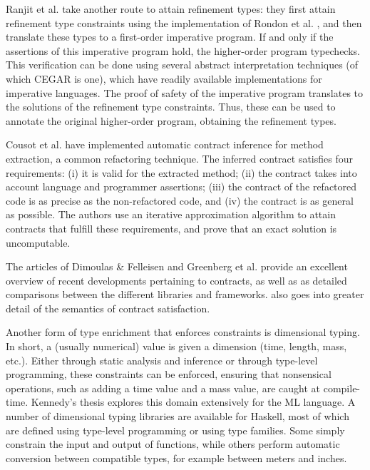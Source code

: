 \documentclass[10pt]{report}
\begin{document}
Ranjit et al. \cite{jhala2010refinement} take another route to attain refinement types: they first attain refinement type constraints using the implementation of Rondon et al. \cite{rondon2008liquid}, and then translate these types to a first-order imperative program.
If and only if the assertions of this imperative program hold, the higher-order program typechecks.
This verification can be done using several abstract interpretation techniques (of which CEGAR is one), which have readily available implementations for imperative languages.
The proof of safety of the imperative program translates to the solutions of the refinement type constraints.
Thus, these can be used to annotate the original higher-order program, obtaining the refinement types.

Cousot et al. \cite{cousotabstract} have implemented automatic contract inference for method extraction, a common refactoring technique.
The inferred contract satisfies four requirements: (i) it is valid for the extracted method; (ii) the contract takes into account language and programmer assertions; (iii) the contract of the refactored code is as precise as the non-refactored code, and (iv) the contract is as general as possible.
The authors use an iterative approximation algorithm to attain contracts that fulfill these requirements, and prove that an exact solution is uncomputable.

The articles of Dimoulas \& Felleisen \cite{Dimoulas:2011:CSH:2039346.2039348} and Greenberg et al. \cite{Greenberg:2010:CMM:1707801.1706341} provide an excellent overview of recent developments pertaining to contracts, as well as as detailed comparisons between the different libraries and frameworks. \cite{Dimoulas:2011:CSH:2039346.2039348} also goes into greater detail of the semantics of contract satisfaction.

Another form of type enrichment that enforces constraints is dimensional typing.
In short, a (usually numerical) value is given a dimension (time, length, mass, etc.).
Either through static analysis and inference or through type-level programming, these constraints can be enforced, ensuring that nonsensical operations, such as adding a time value and a mass value, are caught at compile-time.
Kennedy's thesis \cite{langanddim} explores this domain extensively for the ML language. 
A number of dimensional typing libraries are available for Haskell, most of which are defined using type-level programming or using type families.
Some simply constrain the input and output of functions, while others perform automatic conversion between compatible types, for example between meters and inches.
\end{document}
